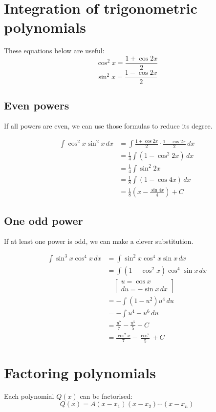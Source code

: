 \documentclass[11pt]{article}
\begin{document}
\newpage
\section{Integration of trigonometric polynomials}
\label{sec:org616feb3}
These equations below are useful:
\[\cos^2 x = \frac{1 + \cos 2x}{2}\]
\[\sin^2 x = \frac{1 - \cos 2x}{2}\]
\subsection{Even powers}
\label{sec:orga0c87fe}
If all powers are even, we can use those formulas to reduce its degree.

\begin{align*}
\int \cos^2 x \sin^2 x \, dx &= \int \frac{1 + \cos 2x}{2} \cdot \frac{1 - \cos 2x}{2} \, dx \\
&= \frac{1}{4} \int (1 - \cos^2 2x) \, dx \\
&= \frac{1}{4} \int \sin^2 2x \\
&= \frac{1}{8} \int (1 - \cos 4x) \, dx \\
&= \frac{1}{8} \left( x - \frac{\sin 4x}{4} \right) + C
\end{align*}

\newpage
\subsection{One odd power}
\label{sec:org7e20157}
If at least one power is odd, we can make a clever substitution.

\begin{align*}
\int \sin^3 x \cos^4 x \, dx &= \int \sin^2 x \cos^4 x \sin x \, dx \\
&= \int (1 - \cos^2 x) \cos^4 \sin x \, dx \\
&\quad \left[ \begin{gathered} u = \cos x \\ du = - \sin x \, dx \end{gathered} \right] \\
&= - \int (1 - u^2) u^4 \, du \\
&= - \int u^4 - u^6 \, du \\
&= \frac{u^7}{7} - \frac{u^5}{5} + C \\
&= \frac{\cos^7 x}{7} - \frac{\cos^5}{5} + C
\end{align*}
\section{Factoring polynomials}
\label{sec:org34c4e72}
Each polynomial \(Q(x)\) can be factorised:
\[Q(x) = A(x - x_1)(x - x_2) \cdots (x - x_n)\]
\end{document}
